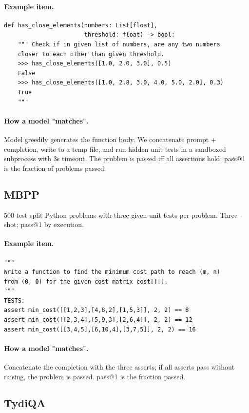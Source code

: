 \paragraph{Example item.}
\begin{verbatim}
def has_close_elements(numbers: List[float],
                       threshold: float) -> bool:
    """ Check if in given list of numbers, are any two numbers
    closer to each other than given threshold.
    >>> has_close_elements([1.0, 2.0, 3.0], 0.5)
    False
    >>> has_close_elements([1.0, 2.8, 3.0, 4.0, 5.0, 2.0], 0.3)
    True
    """
\end{verbatim}

\paragraph{How a model "matches".} Model greedily generates the
function body. We concatenate prompt + completion, write to a
temp file, and run hidden unit tests in a sandboxed subprocess
with 3s timeout. The problem is passed iff all assertions hold;
pass@1 is the fraction of problems passed.

\subsection{MBPP}
\label{app:ex-mbpp}

500 test-split Python problems with three given unit tests per
problem. Three-shot; pass@1 by execution.

\paragraph{Example item.}
\begin{verbatim}
"""
Write a function to find the minimum cost path to reach (m, n)
from (0, 0) for the given cost matrix cost[][].
"""
TESTS:
assert min_cost([[1,2,3],[4,8,2],[1,5,3]], 2, 2) == 8
assert min_cost([[2,3,4],[5,9,3],[2,6,4]], 2, 2) == 12
assert min_cost([[3,4,5],[6,10,4],[3,7,5]], 2, 2) == 16
\end{verbatim}

\paragraph{How a model "matches".} Concatenate the completion with
the three asserts; if all asserts pass without raising, the problem
is passed. pass@1 is the fraction passed.

\subsection{TydiQA}
\label{app:ex-tydiqa}

